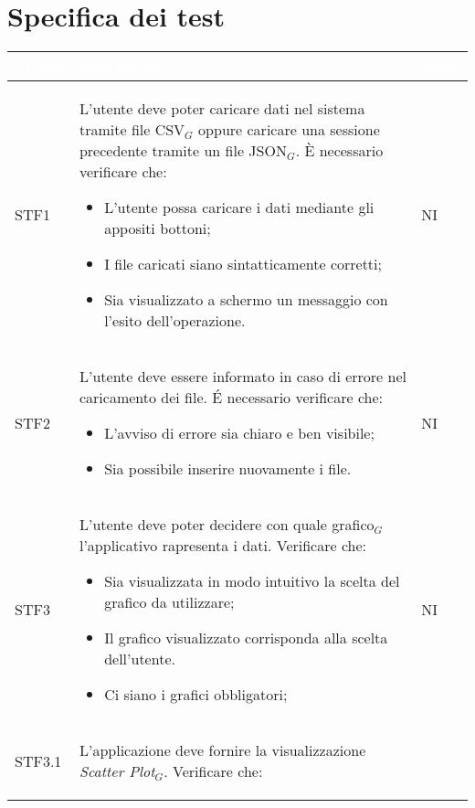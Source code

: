 \section{Specifica dei test}
\begin{center}
    \renewcommand\arraystretch{1.5}
    \centering
    \begin{longtable}{|p{1.5cm}|p{11cm}|p{1cm}|}
    \hline
    \rowcolor[HTML]{036400}
    \textcolor{white}{\textbf{Codice}} & \textcolor{white}{\textbf{Descrizione}} & \textcolor{white}{\textbf{Stato}} \\ \hline
        \rowcolor[HTML]{EFEFEF}
        STF1 & L'utente deve poter caricare dati nel sistema tramite file CSV$_G$ oppure caricare una sessione precedente tramite un file JSON$_G$. \`E necessario verificare che: \begin{itemize}
            \item L'utente possa caricare i dati mediante gli appositi bottoni;
            \item I file caricati siano sintatticamente corretti;
            \item Sia visualizzato a schermo un messaggio con l'esito dell'operazione.
        \end{itemize} & NI\\ \hline
        \rowcolor[HTML]{C0C0C0}
        STF2 & L'utente deve essere informato in caso di errore nel caricamento dei file. \'E necessario verificare che: \begin{itemize}
            \item L'avviso di errore sia chiaro e ben visibile;
            \item Sia possibile inserire nuovamente i file.
        \end{itemize} & NI\\ \hline
        \rowcolor[HTML]{EFEFEF}
        STF3 & L'utente deve poter decidere con quale grafico$_G$ l'applicativo rapresenta i dati. Verificare che: \begin{itemize}
            \item Sia visualizzata in modo intuitivo la scelta del grafico da utilizzare;
            \item Il grafico visualizzato corrisponda alla scelta dell'utente.
            \item Ci siano i grafici obbligatori;
        \end{itemize} & NI\\ \hline
        \rowcolor[HTML]{C0C0C0}
        STF3.1 & L'applicazione deve fornire la visualizzazione  \textit{Scatter Plot}$_G$. Verificare che: \begin{itemize}

\end{itemize}
\end{longtable}
\end{center}
